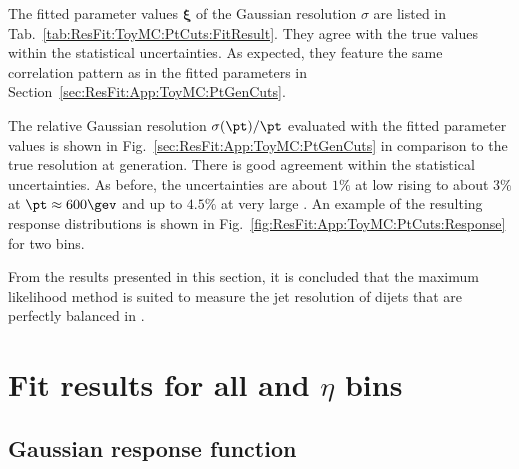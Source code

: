 The fitted parameter values $\mathbf{\xi}$ of the Gaussian resolution $\sigma$ are listed in Tab.~\ref{tab:ResFit:ToyMC:PtCuts:FitResult}.
They agree with the true values within the statistical uncertainties.
As expected, they feature the same correlation pattern as in the
fitted parameters in Section~\ref{sec:ResFit:App:ToyMC:PtGenCuts}.

The relative Gaussian resolution $\sigma(\pt)/\pt$ evaluated with the fitted parameter values is shown in Fig.~\ref{sec:ResFit:App:ToyMC:PtGenCuts} in comparison to the true resolution at generation.
There is good agreement within the statistical uncertainties.
As before, the uncertainties are about $1\%$ at low \pt rising to about $3\%$ at $\pt \approx 600\gev$ and up to $4.5\%$ at very large \pt.
An example of the resulting response distributions is shown in
Fig.~\ref{fig:ResFit:App:ToyMC:PtCuts:Response} for two \pttrue bins.

From the results presented in this section, it is concluded that the
maximum likelihood method is suited to measure the jet \pt resolution
of dijets that are perfectly balanced in \pttrue.

\section{Fit results for all \pt and $\eta$ bins}\label{sec:ResFit:App:AllResults}
\subsection{Gaussian response function}\label{sec:ResFit:App:AllResults:Gauss}

